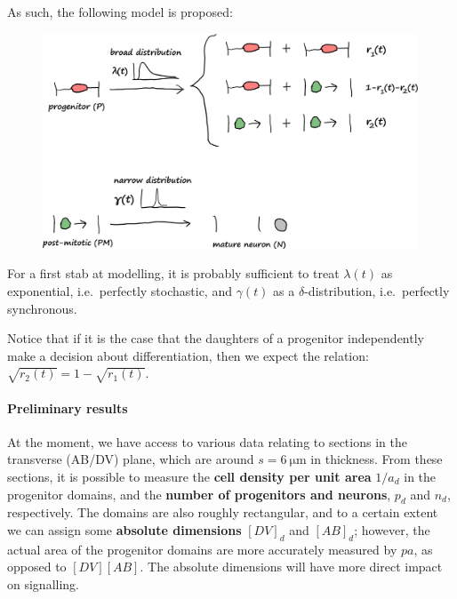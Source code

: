 \documentclass[10pt,english]{report}
\begin{document}
As such, the following model is proposed:

\begin{figure}[h]
	\begin{center}
		\includegraphics[width=4.4in]{division-process-A.png}
	\end{center}
\end{figure}

For a first stab at modelling, it is probably sufficient to treat $\lambda(t)$ as exponential, i.e.\ perfectly stochastic, and $\gamma(t)$ as a $\delta$-distribution, i.e.\ perfectly synchronous.

Notice that if it is the case that the daughters of a progenitor independently make a decision about differentiation, then we expect the relation: $\sqrt{r_2 (t)} = 1 - \sqrt{r_1(t)}$.

\paragraph{Preliminary results}

At the moment, we have access to various data relating to sections in the transverse (AB/DV) plane, which are around $s = \SI{6}{\micro\metre}$ in thickness. From these sections, it is possible to measure the \textbf{cell density per unit area} $1/a_d$ in the progenitor domains, and the \textbf{number of progenitors and neurons}, $p_d$ and $n_d$, respectively. The domains are also roughly rectangular, and to a certain extent we can assign some \textbf{absolute dimensions} $[DV]_d$ and $[AB]_d$; however, the actual area of the progenitor domains are more accurately measured by $p a$, as opposed to $[DV][AB]$. The absolute dimensions will have more direct impact on signalling.
\end{document}
